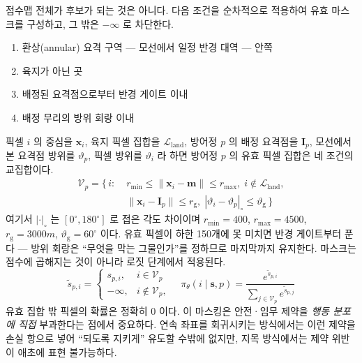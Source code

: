 점수맵 전체가 후보가 되는 것은 아니다. 다음 조건을 순차적으로 적용하여 유효 마스크를
구성하고, 그 밖은 $-\infty$ 로 차단한다.
\begin{enumerate}[leftmargin=*, itemsep=1pt, topsep=3pt]
\item 환상(annular) 요격 구역 --- 모선에서 일정 반경 대역 --- 안쪽
\item 육지가 아닌 곳
\item 배정된 요격점으로부터 반경 게이트 이내
\item 배정 무리의 방위 회랑 이내
\end{enumerate}
픽셀 $i$ 의 중심을 $\mathbf{x}_i$, 육지 픽셀 집합을 $\mathcal{L}_{\mathrm{land}}$, 방어정 $p$ 의 배정
요격점을 $\mathbf{I}_p$, 모선에서 본 요격점 방위를 $\vartheta_p$, 픽셀 방위를 $\vartheta_i$ 라
하면 방어정 $p$ 의 유효 픽셀 집합은 네 조건의 교집합이다.
\begin{equation}
\begin{aligned}
\mathcal{V}_p = \big\{\, i :\; & r_{\min} \le \lVert \mathbf{x}_i - \mathbf{m} \rVert \le r_{\max},\;
  i \notin \mathcal{L}_{\mathrm{land}},\\
  & \lVert \mathbf{x}_i - \mathbf{I}_p \rVert \le r_{\mathrm{g}},\;
  |\vartheta_i - \vartheta_p|_{\circ} \le \vartheta_{\mathrm{g}} \,\big\}
\end{aligned}
\label{eq:validset}
\end{equation}
여기서 $|\cdot|_{\circ}$ 는 $[0^\circ, 180^\circ]$ 로 접은 각도 차이이며 $r_{\min} = 400$,
$r_{\max} = 4500$, $r_{\mathrm{g}} = 3000\unit{m}$, $\vartheta_{\mathrm{g}} = 60^\circ$ 이다.
유효 픽셀이 하한 150개에 못 미치면 반경 게이트부터 푼다 --- 방위 회랑은 ``무엇을 막는
그물인가''를 정하므로 마지막까지 유지한다. 마스크는 점수에 곱해지는 것이 아니라 로짓
단계에서 적용된다.
\begin{equation}
\tilde{s}_{p,i} = \begin{cases} s_{p,i}, & i \in \mathcal{V}_p \\ -\infty, & i \notin \mathcal{V}_p, \end{cases}
\quad
\pi_\theta(i \mid \mathbf{s}, p) = \frac{e^{\tilde{s}_{p,i}}}{\sum_{j \in \mathcal{V}_p} e^{\tilde{s}_{p,j}}}
\label{eq:masked_softmax}
\end{equation}
유효 집합 밖 픽셀의 확률은 정확히 0 이다. 이 마스킹은 안전·임무 제약을 \emph{행동 분포에 직접} 부과한다는 점에서 중요하다. 연속 좌표를
회귀시키는 방식에서는 이런 제약을 손실 항으로 넣어 ``되도록 지키게'' 유도할 수밖에 없지만,
지목 방식에서는 제약 위반이 애초에 표현 불가능하다.

